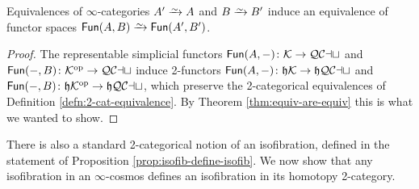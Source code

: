   \begin{corollary}\label{cor:equiv-invar-fun}
     Equivalences of $\infty$-categories $A' \we A$ and $B \we B'$ induce an equivalence of functor spaces $\Fun(A,B) \we \Fun(A',B')$.
  \end{corollary}
  \begin{proof}
  The representable simplicial functors ${\mathord{\mathsf{Fun}}}(A,-)\colon {\mathord{\mathcal{K}}} \to {\mathord{\mathcal{QCat}}}$ and ${\mathord{\mathsf{Fun}}}(-,B)\colon {\mathord{\mathcal{K}}}^{\mathord{\textup{op}}} \to {\mathord{\mathcal{QCat}}}$ induce 2-functors ${\mathord{\mathsf{Fun}}}(A,-)\colon\mathfrak{h}{\mathord{\mathcal{K}}}\to\mathfrak{h}{\mathord{\mathcal{QCat}}}$ and ${\mathord{\mathsf{Fun}}}(-,B)\colon\mathfrak{h}{\mathord{\mathcal{K}}}^{\mathord{\textup{op}}}\to\mathfrak{h}{\mathord{\mathcal{QCat}}}$, which preserve the 2-cat\-e\-go\-ri\-cal equivalences of Definition \ref{defn:2-cat-equivalence}. By Theorem \ref{thm:equiv-are-equiv} this is what we wanted to show.
  \end{proof}

  There is also a standard 2-categorical notion of an isofibration, defined in the statement of Proposition \ref{prop:isofib-define-isofib}. %
  We now show that any isofibration in an $\infty$-cosmos defines an isofibration in its homotopy 2-category.

